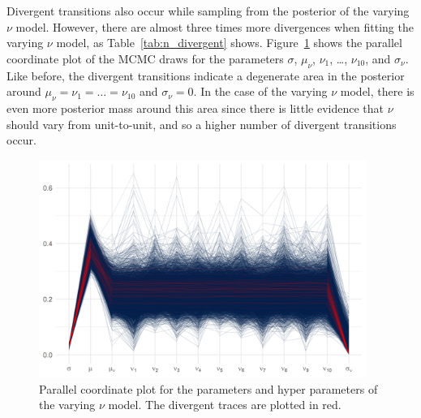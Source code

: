 

Divergent transitions also occur while sampling from the posterior of the varying $\nu$ model. However, there are almost three times more divergences when fitting the varying $\nu$ model, as Table~\ref{tab:n_divergent} shows. Figure~\ref{fig:pp_nu_parcoord} shows the parallel coordinate plot of the MCMC draws for the parameters $\sigma$, $\mu_\nu$, $\nu_1$, \ldots, $\nu_{10}$, and $\sigma_\nu$. Like before, the divergent transitions indicate a degenerate area in the posterior around $\mu_\nu = \nu_1 = \ldots = \nu_{10}$ and $\sigma_\nu = 0$. In the case of the varying $\nu$ model, there is even more posterior mass around this area since there is little evidence that $\nu$ should vary from unit-to-unit, and so a higher number of divergent transitions occur.

\begin{figure}
   \centering
   \includegraphics[width=0.95\textwidth]{./figures/ch-5/plot-pp-nu-parcoord.png}
   \caption{Parallel coordinate plot for the parameters and hyper parameters of the varying $\nu$ model. The divergent traces are plotted in red.}
   \label{fig:pp_nu_parcoord} 
\end{figure}

